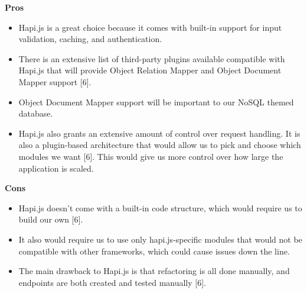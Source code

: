 		\textbf{Pros} 
			\begin{itemize}
				\item Hapi.js is a great choice because it comes with built-in support for input validation, caching, and authentication. 
				\item There is an extensive list of third-party plugins available compatible with Hapi.js that will provide Object Relation Mapper and Object Document Mapper support [6]. 
				\item Object Document Mapper support will be important to our NoSQL themed database. 
				\item Hapi.js also grants an extensive amount of control over request handling. It is also a plugin-based architecture that would allow us to pick and choose which modules we want [6]. This would give us more control over how large the application is scaled.
			\end{itemize}	
		\textbf{Cons}
			\begin{itemize}
				\item Hapi.js doesn't come with a built-in code structure, which would require us to build our own [6].
				\item It also would require us to use only hapi.js-specific modules that would not be compatible with other frameworks, which could cause issues down the line. 
				\item The main drawback to Hapi.js is that refactoring is all done manually, and endpoints are both created and tested manually [6].
			\end{itemize}	
	
